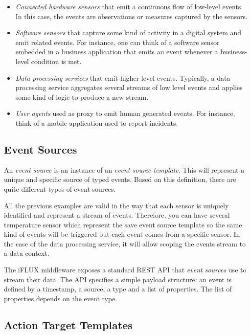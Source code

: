 \begin{itemize}
\item \emph{Connected hardware sensors} that emit a continuous flow of low-level events. In this case, the events are observations or measures captured by the sensors.
\item \emph{Software sensors} that capture some kind of activity in a digital system and emit related events. For instance, one can think of a software sensor embedded in a business application that emits an event whenever a business-level condition is met.
\item \emph{Data processing services} that emit higher-level events. Typically, a data processing service aggregates several streams of low level events and applies some kind of logic to produce a new stream.
\item \emph{User agents} used as proxy to emit human generated events. For instance, think of a mobile application used to report incidents.
\end{itemize}

\subsection{Event Sources}
\label{sec:es}

An \emph{event source} is an instance of an \emph{event source template}. This will represent a unique and specific source of typed events. Based on this definition, there are quite different types of event sources. 

All the previous examples are valid in the way that each sensor is uniquely identified and represent a stream of events. Therefore, you can have several temperature sensor which represent the save event source template so the same kind of events will be triggered but each event comes from a specific sensor. In the case of the data processing service, it will allow scoping the events stream to a data context.

The iFLUX middleware exposes a standard REST API that \emph{event sources} use to stream their data. The API specifies a simple payload structure: an event is defined by a timestamp, a source, a type and a list of properties. The list of properties depends on the event type.

\subsection{Action Target Templates}
\label{sec:att}


